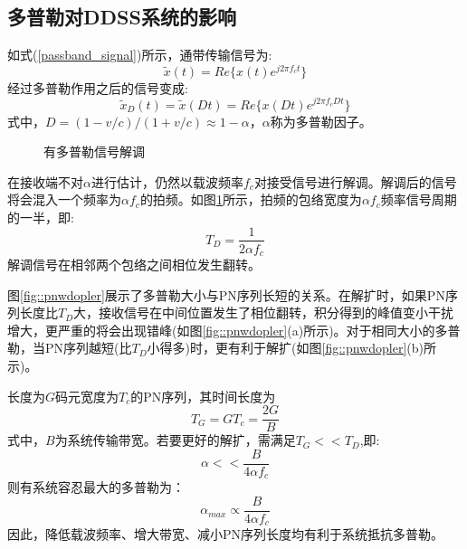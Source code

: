 \subsection{多普勒对DDSS系统的影响}
\label{sec:ddcode:dopuler}
如式(\ref{passband_signal})所示，通带传输信号为:
\[ \widetilde{x}(t)=Re\{x(t)e^{j2\pi f_ct}\} \]
经过多普勒作用之后的信号变成:
\begin{equation}
\widetilde{x}_D(t)=\widetilde{x}(Dt)=Re\{x(Dt)e^{j2\pi f_cDt}\}
\end{equation}
式中，$D=(1-v/c)/(1+v/c)\approx1-\alpha$，$\alpha$称为多普勒因子。

\begin{figure}[htbp]
	\centering
	
	
	\caption{有多普勒信号解调}
	\label{fig::paiping}
\end{figure}

在接收端不对$\alpha$进行估计，仍然以载波频率$f_c$对接受信号进行解调。解调后的信号将会混入一个频率为$\alpha f_c$的拍频。如图\ref{fig::paiping}所示，拍频的包络宽度为$\alpha f_c$频率信号周期的一半，即:
\begin{equation}
\label{equ:ddcode:td}
T_D=\frac{1}{2\alpha f_c}
\end{equation}
解调信号在相邻两个包络之间相位发生翻转。

图\ref{fig::pnwdopler}展示了多普勒大小与PN序列长短的关系。在解扩时，如果PN序列长度比$T_D$大，接收信号在中间位置发生了相位翻转，积分得到的峰值变小干扰增大，更严重的将会出现错峰(如图\ref{fig::pnwdopler}(a)所示)。对于相同大小的多普勒，当PN序列越短(比$T_D$小得多)时，更有利于解扩(如图\ref{fig::pnwdopler}(b)所示)。

长度为$G$码元宽度为$T_c$的PN序列，其时间长度为\[T_G=GT_c=\frac{2G}{B}\]式中，$B$为系统传输带宽。若要更好的解扩，需满足$T_G<<T_D$,即:
\[
\alpha << \frac{B}{4\alpha f_c}
\]
则有系统容忍最大的多普勒为：
\begin{equation}
\alpha_{max} \varpropto \frac{B}{4\alpha f_c}
\end{equation}
因此，降低载波频率、增大带宽、减小PN序列长度均有利于系统抵抗多普勒。

